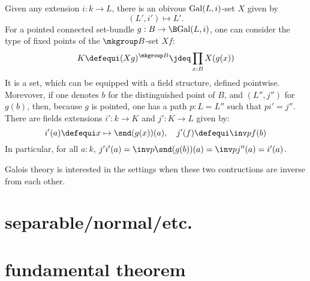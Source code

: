 Given any extension $i:k \to L$, there is an obivous $\mathrm{Gal}(L,i)$-set $X$ given by 
\begin{displaymath}
  (L',i') \mapsto L'.
\end{displaymath}
For a pointed connected set-bundle $g:B \to \B \Gal(L,i)$, one can consider the
type of fixed points of the $\mkgroup B$-set $Xf$:
\begin{displaymath}
  K \defequi (Xg)^{\mkgroup B} \jdeq \prod_{x:B}X(g(x))
\end{displaymath}
It is a set, which can be equipped with a field structure, defined pointwise.
Morevover, if one denotes $b$ for the distinguished point of $B$, and $(L'',j'')$ for $g(b)$, then, because $g$ is pointed, one has a path $p:L=L''$ such that $pi'=j''$. There are
fields extensions $i':k \to K$ and $j':K \to L$ given by:
\begin{displaymath}
  i'(a) \defequi x\mapsto \snd(g(x))(a),\quad
  j'(f) \defequi \inv p f(b)
\end{displaymath}
In particular, for all $a:k$, $j'i'(a) = \inv p \snd(g(b))(a) = \inv p j''(a) = i'(a)$.

Galois theory is interested in the settings when these two contructions are inverse from each other.

\section{separable/normal/etc.}
\label{sec:cover-spac-fields-1}

\section{fundamental theorem}
\label{sec:fundamental-theorem}



